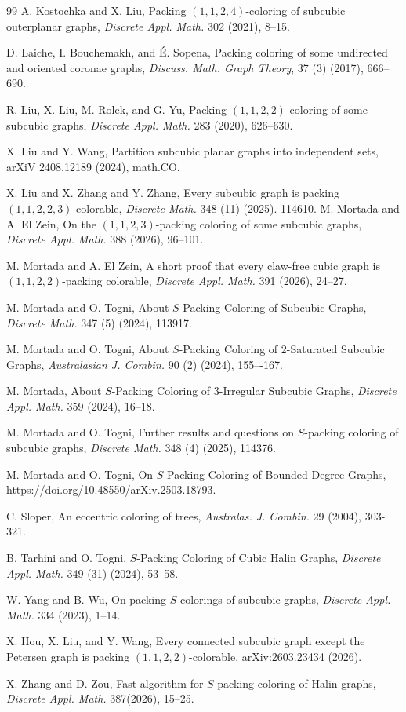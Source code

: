 \documentclass[12pt, oneside]{scrartcl}
\begin{document}
\begin{thebibliography}{99}
 A. Kostochka and X. Liu, Packing $(1,1,2,4)$-coloring of subcubic outerplanar graphs, \textit{Discrete Appl. Math.} 302 (2021), 8--15.
 
 D. Laiche, I. Bouchemakh, and \'{E}. Sopena, Packing coloring of some undirected and oriented coronae graphs,\textit{ Discuss. Math. Graph Theory}, 37 (3) (2017), 666--690.
   
 R. Liu, X. Liu, M. Rolek, and G. Yu, Packing $(1,1,2,2)$-coloring of some subcubic graphs, \textit{Discrete Appl. Math.} 283 (2020), 626--630.

  X. Liu and Y. Wang, Partition subcubic planar graphs into independent sets, arXiV 2408.12189 (2024), math.CO.

 X. Liu and X. Zhang and Y. Zhang, Every subcubic graph is packing $(1,1,2,2,3)$-colorable, \textit{Discrete Math.} 348 (11) (2025). 114610. 
 M. Mortada and A. El Zein, On the $(1,1,2,3)$-packing coloring of some subcubic graphs, \textit{Discrete Appl. Math.} 388 (2026), 96--101.

 M. Mortada and A. El Zein, A short proof that every claw-free cubic graph is $(1,1,2,2)$-packing colorable, \textit{Discrete Appl. Math.} 391 (2026), 24--27.

 M. Mortada and O. Togni, About $S$-Packing Coloring of Subcubic Graphs, \textit{Discrete Math.} 347 (5) (2024), 113917.

 M. Mortada and O. Togni, About $S$-Packing Coloring of 2-Saturated Subcubic Graphs, \textit{Australasian J. Combin.} 90 (2) (2024), 155–-167.

 M. Mortada, About $S$-Packing Coloring of 3-Irregular Subcubic Graphs, \textit{Discrete Appl. Math.} 359 (2024), 16--18.

 M. Mortada and O. Togni, Further results and questions on $S$-packing coloring of subcubic graphs, \textit{Discrete Math.} 348 (4) (2025), 114376.

 M. Mortada and O. Togni, On $S$-Packing Coloring of Bounded Degree Graphs, https://doi.org/10.48550/arXiv.2503.18793.

 C. Sloper, An eccentric coloring of trees, \textit{Australas. J. Combin.} 29 (2004), 303-321.

 B. Tarhini and O. Togni, $S$-Packing Coloring of Cubic Halin Graphs, \textit{Discrete Appl. Math.} 349 (31) (2024), 53--58.

  W. Yang and B. Wu, On packing $S$-colorings of subcubic graphs, \textit{Discrete Appl. Math.} 334 (2023), 1--14.

 X. Hou, X. Liu, and Y. Wang, Every connected subcubic graph except the Petersen graph is packing $(1,1,2,2)$-colorable, arXiv:2603.23434 (2026).

 X. Zhang and D. Zou, Fast algorithm for $S$-packing coloring of Halin graphs, \textit{Discrete Appl. Math.} 387(2026), 15--25.
\end{thebibliography}
\end{document}
